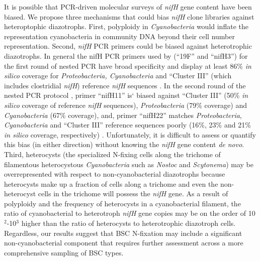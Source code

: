 It is possible that PCR-driven molecular surveys of \textit{nifH}
gene content have been biased. We propose three mechanisms that could bias
\textit{nifH} clone libraries against heteroptophic diazotrophs. First,
polyploidy in \textit{Cyanobacteria} \citep{Griese_2011} would inflate 
the representation cyanobacteria in community DNA beyond their cell number
representation. Second, \textit{nifH} PCR primers could be biased against
heterotrophic diazotrophs. In general the nifH PCR primers used by
\citet{Yeager,14766579,Yeager_2012} (``19F'' and ``nifH3'') for the first round
of nested PCR have broad specificity and display at least 86\% \textit{in
silico} coverage for \textit{Proteobacteria, Cyanobacteria} and ``Cluster III''
(which includes clostridial \textit{nifH}) reference \textit{nifH} sequences
\citep{Gaby_2012}. In the second round of the nested PCR protocol
\citep{Yeager,14766579,Yeager_2012}, primer ``nifH11'' is` biased against
``Cluster III'' (50\% \textit{in silico} coverage of reference \textit{nifH}
sequences), \textit{Proteobacteria} (79\% coverage) and
\textit{Cyanobacteria} (67\% coverage), and, primer ``nifH22'' matches
\textit{Proteobacteria}, \textit{Cyanobacteria} and ``Cluster III'' reference
sequences poorly (16\%, 23\% and 21\% \textit{in silico} coverage,
respectively) \citep{Gaby_2012}.  Unfortunately, it is difficult to assess or
quantify this bias (in either direction) without knowing the \textit{nifH} gene
content \textit{de novo}. Third, heterocysts (the specialized N-fixing cells
along the trichome of filamentous heterocystous \textit{Cyanobacteria} such as
\textit{Nostoc} and \textit{Scytonema}) may be overrepresented with respect to
non-cyanobacterial diazotrophs because heterocysts make up a fraction of cells
along a trichome and even the non-heterocyst cells in the trichome will possess
the \textit{nifH} gene. As a result of polyploidy and the frequency of
heterocysts in a cyanobacterial filament, the ratio of cyanobacterial
to heterotroph \textit{nifH} gene copies may be on the order of
10$^{2}$-10$^{3}$ higher than the ratio of heterocysts to heterotrophic
diazotroph cells. Regardless, our results suggest that BSC N-fixation may
include a significant non-cyanobacterial component that requires further
assessment across a more comprehensive sampling of BSC types.

